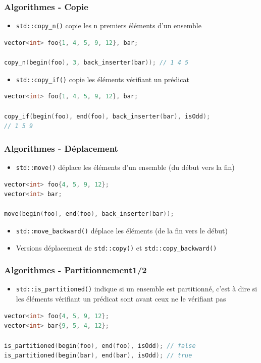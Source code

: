 \documentclass[C++.tex]{subfiles}
\begin{document}
\begin{frame}[fragile]
	\frametitle{Algorithmes - Copie}
	\begin{itemize}
		\item \lstinline|std::copy_n()| copie les n premiers éléments d'un ensemble
	\end{itemize}

	\begin{lstlisting}[language=C++]
vector<int> foo{1, 4, 5, 9, 12}, bar;

copy_n(begin(foo), 3, back_inserter(bar)); // 1 4 5\end{lstlisting}

	\begin{itemize}
		\item \lstinline|std::copy_if()| copie les éléments vérifiant un prédicat
	\end{itemize}

	\begin{lstlisting}[language=C++]
vector<int> foo{1, 4, 5, 9, 12}, bar;

copy_if(begin(foo), end(foo), back_inserter(bar), isOdd);
// 1 5 9\end{lstlisting}
\end{frame}

\begin{frame}[fragile]
	\frametitle{Algorithmes - Déplacement}
	\begin{itemize}
		\item \lstinline|std::move()| déplace les éléments d'un ensemble (du début vers la fin)
	\end{itemize}

	\begin{lstlisting}[language=C++]
vector<int> foo{4, 5, 9, 12};
vector<int> bar;

move(begin(foo), end(foo), back_inserter(bar));\end{lstlisting}

	\begin{itemize}
		\item \lstinline|std::move_backward()| déplace les éléments (de la fin vers le début)
		\item Versions \og déplacement\fg{} de \lstinline|std::copy()| et \lstinline|std::copy_backward()|
	\end{itemize}
\end{frame}

\begin{frame}[fragile]
	\frametitle{Algorithmes - Partitionnement\titlehfill{}1/2}
	\begin{itemize}
		\item \lstinline|std::is_partitioned()| indique si un ensemble est partitionné, c'est à dire si les éléments vérifiant un prédicat sont avant ceux ne le vérifiant pas
	\end{itemize}

	\begin{lstlisting}[language=C++]
vector<int> foo{4, 5, 9, 12};
vector<int> bar{9, 5, 4, 12};

is_partitioned(begin(foo), end(foo), isOdd); // false
is_partitioned(begin(bar), end(bar), isOdd); // true\end{lstlisting}
\end{frame}
\end{document}
